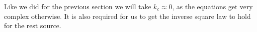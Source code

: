 

Like we did for the previous section we will take $k_c \approx 0$, as the equations get very complex otherwise.
It is also required for us to get the inverse square law to hold for the rest source.

